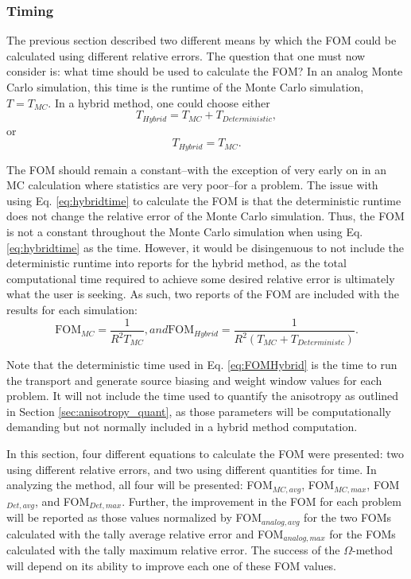 \subsubsection{Timing}

The previous section described two different means by which the FOM could be
calculated using different relative errors. The question that one must
now consider is: what time should be used to
calculate the FOM? In an analog Monte Carlo simulation, this time is the runtime
of the Monte Carlo simulation, $T = T_{MC}$. In a hybrid method, one could choose
either
\begin{equation}
  T_{Hybrid} = T_{MC} + T_{Deterministic},
\label{eq:hybridtime}
\end{equation}
or
\begin{equation}
  T_{Hybrid} = T_{MC} .
\end{equation}

The FOM should remain a constant--with the exception of very early on in an MC
calculation where statistics are very poor--for a problem. The issue with using
Eq. \eqref{eq:hybridtime} to calculate the FOM is that the deterministic runtime
does not change the relative error of the Monte Carlo simulation. Thus, the FOM
is not a constant throughout the Monte Carlo simulation when using Eq.
\eqref{eq:hybridtime} as the time.
However, it would be disingenuous to not include the deterministic runtime into
reports for the hybrid method, as the total computational time required to
achieve some desired relative error is ultimately what the user is seeking. As
such, two reports of the FOM are included with the results for each simulation:
\begin{subequations}
  \begin{equation}
    \text{FOM}_{MC} = \frac{1}{R^{2}T_{MC}},
  \label{eq:FOMMC}
  \end{equation}
and
  \begin{equation}
    \text{FOM}_{Hybrid} = \frac{1}{R^{2}(T_{MC} + T_{Deterministc})} .
  \label{eq:FOMHybrid}
  \end{equation}
  \label{eq:FOMtime}
\end{subequations}

Note that the deterministic time used in Eq. \eqref{eq:FOMHybrid} is the time
to run the transport and generate source biasing and weight window values for
each problem. It will not include the time used to quantify the anisotropy as
outlined in Section \ref{sec:anisotropy_quant}, as those parameters will be
computationally demanding but not normally included in a hybrid method
computation.

In this section, four different equations to calculate the FOM were presented: two
using different relative errors, and two using different quantities
for time. In analyzing the method, all four will be presented: FOM$_{MC,avg}$,
FOM$_{MC,max}$, FOM$_{Det,avg}$, and FOM$_{Det,max}$. Further, the improvement
in the FOM for each problem will be reported as those values normalized by
FOM$_{analog,avg}$ for the two FOMs calculated with the tally average relative
error and FOM$_{analog,max}$ for the FOMs calculated with the tally maximum
relative error. The success of the $\Omega$-method will depend on its ability
to improve
each one of these FOM values.

